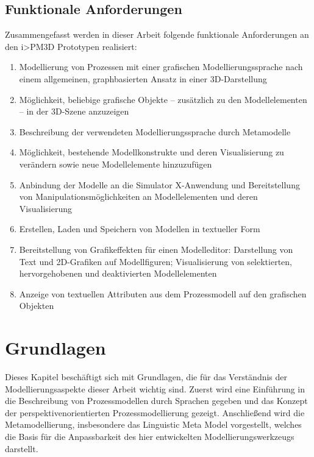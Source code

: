 \documentclass[a4paper,10pt]{sphinxmanual}
\begin{document}
\section{Funktionale Anforderungen}
\label{einleitung:anforderungen}\label{einleitung:funktionale-anforderungen}
Zusammengefasst werden in dieser Arbeit folgende funktionale Anforderungen an den i\textgreater{}PM3D Prototypen realisiert:
\begin{enumerate}
\item {} 
Modellierung von Prozessen mit einer grafischen Modellierungssprache nach einem allgemeinen, graphbasierten Ansatz in einer 3D-Darstellung

\item {} 
Möglichkeit, beliebige grafische Objekte – zusätzlich zu den Modellelementen – in der 3D-Szene anzuzeigen

\item {} 
Beschreibung der verwendeten Modellierungssprache durch Metamodelle

\item {} 
Möglichkeit, bestehende Modellkonstrukte und deren Visualisierung zu verändern sowie neue Modellelemente hinzuzufügen

\item {} 
Anbindung der Modelle an die Simulator X-Anwendung und Bereitstellung von Manipulationsmöglichkeiten an Modellelementen und deren Visualisierung

\item {} 
Erstellen, Laden und Speichern von Modellen in textueller Form

\item {} 
Bereitstellung von Grafikeffekten für einen Modelleditor: Darstellung von Text und 2D-Grafiken auf Modellfiguren; Visualisierung von selektierten, hervorgehobenen und deaktivierten Modellelementen

\item {} 
Anzeige von textuellen Attributen aus dem Prozessmodell auf den grafischen Objekten

\end{enumerate}


\chapter{Grundlagen}
\label{grundlagen:grundlagen}\label{grundlagen::doc}
Dieses Kapitel beschäftigt sich mit Grundlagen, die für das Verständnis der Modellierungsaspekte dieser Arbeit wichtig sind.
Zuerst wird eine Einführung in die Beschreibung von Prozessmodellen durch Sprachen gegeben und das Konzept der perspektivenorientierten Prozessmodellierung \cite{jablonski_workflow_1996} gezeigt.
Anschließend wird die Metamodellierung, insbesondere das Linguistic Meta Model \cite{volz_werkzeugunterstutzung_2011} vorgestellt, welches die Basis für die Anpassbarkeit des hier entwickelten Modellierungswerkzeugs darstellt.
\end{document}
